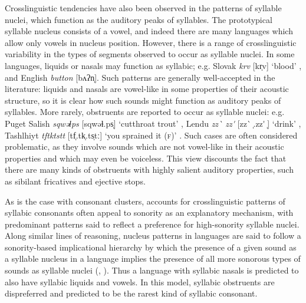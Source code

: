   Crosslinguistic tendencies have also been observed in the patterns of syllable nuclei, which function as the auditory peaks of syllables. The prototypical syllable nucleus consists of a vowel, and indeed there are many languages which allow only vowels in nucleus position. However, there is a range of crosslinguistic variability in the types of segments observed to occur as syllable nuclei. In some languages, liquids or nasals may function as syllabic; e.g. Slovak \textit{krv} [kr̩v] ‘blood’ \citep[186]{Zec2007}, and English \textit{button} [bʌʔn̩]. Such patterns are generally well-accepted in the literature: liquids and nasals are vowel-like in some properties of their acoustic structure, so it is clear how such sounds might function as auditory peaks of syllables. More rarely, obstruents are reported to occur as syllable nuclei: e.g. Puget Salish \textit{sqwəɬps} [sqwəɬ.ps̩] ‘cutthroat trout’ \citep[62]{Hoard1978}, Lendu \textit{zz\`{} zz\'{} } [zz\`{} ̩.zz\'{} ̩] ‘drink’ \citep[483]{Demolin2002}, Tashlhiyt \textit{tftktstt} [tf̩.tk̩.ts̩tː] ‘you sprained it (\textsc{f})’ \citep[332]{Ridouane2008}. Such cases are often considered problematic, as they involve sounds which are not vowel-like in their acoustic properties and which may even be voiceless. This view discounts the fact that there are many kinds of obstruents with highly salient auditory properties, such as sibilant fricatives and ejective stops.



  As is the case with consonant clusters, accounts for crosslinguistic patterns of syllabic consonants often appeal to sonority as an explanatory mechanism, with predominant patterns said to reflect a preference for high-sonority syllable nuclei. Along similar lines of reasoning, nucleus patterns in languages are said to follow a sonority-based implicational hierarchy by which the presence of a given sound as a syllable nucleus in a language implies the presence of all more sonorous types of sounds as syllable nuclei (\citealt{Blevins1995}, \citealt{Zec2007}). Thus a language with syllabic nasals is predicted to also have syllabic liquids and vowels. In this model, syllabic obstruents are dispreferred and predicted to be the rarest kind of syllabic consonant.



